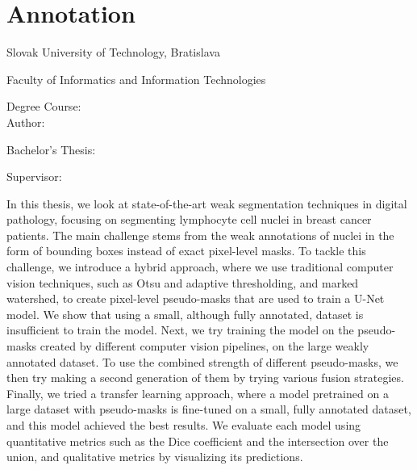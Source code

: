 
\thispagestyle{empty}

\section*{Annotation}

\begin{minipage}[t]{1\columnwidth}%
Slovak University of Technology, Bratislava 

Faculty of Informatics and Information Technologies

Degree Course: \myStudyProgram\\

Author: \myName

Bachelor's Thesis: \myTitle

Supervisor: \mySupervisor

\myDate%
\end{minipage}

\bigskip{}


In this thesis, we look at state-of-the-art weak segmentation techniques in digital pathology, focusing on segmenting lymphocyte cell nuclei in breast cancer patients. The main challenge stems from the weak annotations of nuclei in the form of bounding boxes instead of exact pixel-level masks. To tackle this challenge, we introduce a hybrid approach, where we use traditional computer vision techniques, such as Otsu and adaptive thresholding, and marked watershed, to create pixel-level pseudo-masks that are used to train a U-Net model. 
We show that using a small, although fully annotated, dataset is insufficient to train the model. Next, we try training the model on the pseudo-masks created by different computer vision pipelines, on the large weakly annotated dataset. To use the combined strength of different pseudo-masks, we then try making a second generation of them by trying various fusion strategies. Finally, we tried a transfer learning approach, where a model pretrained on a large dataset with pseudo-masks is fine-tuned on a small, fully annotated dataset, and this model achieved the best results. We evaluate each model using quantitative metrics such as the Dice coefficient and the intersection over the union, and qualitative metrics by visualizing its predictions.

